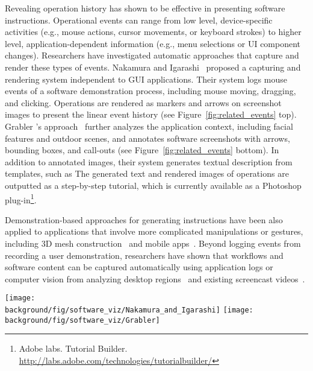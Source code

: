 Revealing operation history has shown to be effective in presenting software instructions. Operational events can range from low level, device-specific activities (e.g., mouse actions, cursor movements, or keyboard strokes) to higher level, application-dependent information (e.g., menu selections or UI component changes).
%
Researchers have investigated automatic approaches that capture and render these types of events. Nakamura and Igarashi~\cite{Nakamura:2008:ASV:1449715.1449721} proposed a capturing and rendering system independent to GUI applications. Their system logs mouse events of a software demonstration process, including mouse moving, dragging, and clicking. Operations are rendered as markers and arrows on screenshot images to present the linear event history (see Figure~\ref{fig:related_events} top).
%
Grabler \ea{}'s approach~\cite{Grabler:2009jj} further analyzes the application context, including facial features and outdoor scenes, and annotates software screenshots with arrows, bounding boxes, and call-outs (see Figure~\ref{fig:related_events} bottom). In addition to annotated images, their system generates textual description from templates, such as  The generated text and rendered images of operations are outputted as a step-by-step tutorial, which is currently available as a Photoshop plug-in\footnote{Adobe labs. Tutorial Builder. \url{http://labs.adobe.com/technologies/tutorialbuilder/}}.

Demonstration-based approaches for generating instructions have been also applied to applications that involve more complicated manipulations or gestures, including 3D mesh construction~\cite{Denning:2011fy} and mobile apps~\cite{Wang:2014:EAC:2556288.2557407}.
%
Beyond logging events from recording a user demonstration, researchers have shown that workflows and software content can be captured automatically using application logs \cite{Grossman:2010jz,Grabler:2009jj,Pongnumkul:2011ju} or computer vision from analyzing desktop regions~\cite{Yeh:2009dh,Chang:2011vd} and existing screencast videos~\cite{Banovic:2012kd}.

\begin{figure*}[t!]
  \centering
  \texttt{[image: \\background/fig/software\_viz/Nakamura\_and\_Igarashi]}
  \texttt{[image: \\background/fig/software\_viz/Grabler]}
  \caption{Example screenshots that visualize mouse operations are automatically rendered, including (top) mouse move, drag, click, and wheel (a-d) by Nakamura and Igarashi~\cite{Nakamura:2008:ASV:1449715.1449721} and (bottom) application-specific operations (a-b), parameters (c-f), and manipulations (g-h) by Grabler \ea{}~\cite{Grabler:2009jj}.}
  \label{fig:related_events}
\end{figure*}

